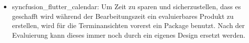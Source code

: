 \begin{itemize}
	\item syncfusion\_flutter\_calendar\cite{tech_packageCalendar}: Um Zeit zu sparen und sicherzustellen, dass es geschafft wird während der Bearbeitungszeit ein evaluierbares Produkt zu erstellen, wird für die Terminansichten vorerst ein Package benutzt. Nach der Evaluierung kann dieses immer noch durch ein eigenes Design ersetzt werden.  
\end{itemize}
